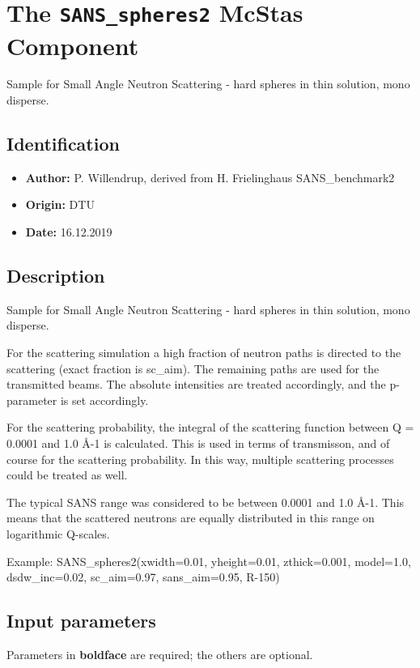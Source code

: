 \section{The \texttt{SANS\_spheres2} McStas Component}
Sample for Small Angle Neutron Scattering - hard spheres in thin solution, mono disperse.

\subsection*{Identification}
\begin{itemize}
  \item \textbf{Author:} P. Willendrup, derived from H. Frielinghaus SANS\_benchmark2
  \item \textbf{Origin:} DTU
  \item \textbf{Date:} 16.12.2019
\end{itemize}

\subsection*{Description}
Sample for Small Angle Neutron Scattering - hard spheres in thin solution, mono disperse.

For the scattering simulation a high fraction of neutron paths is directed to the scattering (exact fraction is sc\_aim). The remaining paths are used for the transmitted beams. The absolute intensities are treated accordingly, and the p-parameter is set accordingly.

For the scattering probability, the integral of the scattering function between Q = 0.0001 and 1.0 \AA{}-1 is calculated. This is used in terms of transmisson, and of course for the scattering probability. In this way, multiple scattering processes could be treated as well.

The typical SANS range was considered to be between 0.0001 and 1.0 \AA{}-1. This means that the scattered neutrons are equally distributed in this range on logarithmic Q-scales.

Example: SANS\_spheres2(xwidth=0.01, yheight=0.01, zthick=0.001, model=1.0, dsdw\_inc=0.02, sc\_aim=0.97, sans\_aim=0.95, R-150)

\subsection*{Input parameters}
Parameters in \textbf{boldface} are required; the others are optional.

